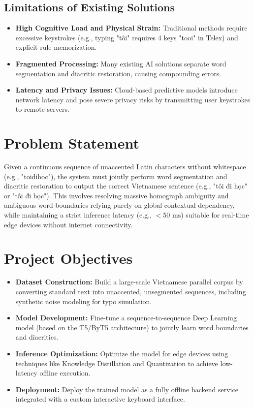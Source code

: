 \subsection{Limitations of Existing Solutions}
\begin{itemize}
    \item \textbf{High Cognitive Load and Physical Strain:} Traditional methods require excessive keystrokes (e.g., typing "tôi" requires 4 keys "tooi" in Telex) and explicit rule memorization.
    \item \textbf{Fragmented Processing:} Many existing AI solutions separate word segmentation and diacritic restoration, causing compounding errors.
    \item \textbf{Latency and Privacy Issues:} Cloud-based predictive models introduce network latency and pose severe privacy risks by transmitting user keystrokes to remote servers.
\end{itemize}

\section{Problem Statement}
Given a continuous sequence of unaccented Latin characters without whitespace (e.g., "toidihoc"), the system must jointly perform word segmentation and diacritic restoration to output the correct Vietnamese sentence (e.g., "tôi đi học" or "tối đi học"). This involves resolving massive homograph ambiguity and ambiguous word boundaries relying purely on global contextual dependency, while maintaining a strict inference latency (e.g., $<50\text{ ms}$) suitable for real-time edge devices without internet connectivity.

\section{Project Objectives}
\begin{itemize}
    \item \textbf{Dataset Construction:} Build a large-scale Vietnamese parallel corpus by converting standard text into unaccented, unsegmented sequences, including synthetic noise modeling for typo simulation.
    \item \textbf{Model Development:} Fine-tune a sequence-to-sequence Deep Learning model (based on the T5/ByT5 architecture) to jointly learn word boundaries and diacritics.
    \item \textbf{Inference Optimization:} Optimize the model for edge devices using techniques like Knowledge Distillation and Quantization to achieve low-latency offline execution.
    \item \textbf{Deployment:} Deploy the trained model as a fully offline backend service integrated with a custom interactive keyboard interface.
\end{itemize}

